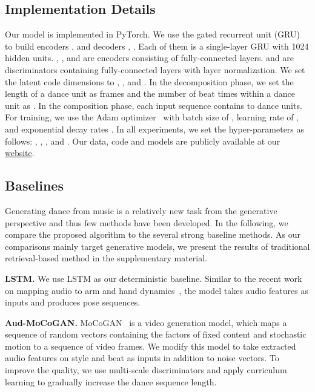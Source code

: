 \documentclass{article}
\newcommand{\tb}[1]{\textbf{#1}}
\newlength\secmargin
\newlength\subsecmargin
\begin{document}
\subsection{Implementation Details}
\label{subsec:implement}
Our model is implemented in PyTorch. 
We use the gated recurrent unit (GRU) to build encoders ,  and decoders , . 
Each of them is a single-layer GRU with 1024 hidden units. 
, , and  are encoders consisting of  fully-connected layers.
 and  are discriminators containing  fully-connected layers with layer normalization.
We set the latent code dimensions to , , and . 
In the decomposition phase, we set the length of a dance unit as  frames and the number of beat times within a dance unit as . 
In the composition phase, each input sequence contains  to  dance units.
For training, we use the Adam optimizer~\cite{adam} with batch size of , learning rate of , and exponential decay rates . 
In all experiments, we set the hyper-parameters as follows: , , , and . 
Our data, code and models are publicly available at our \href{https://github.com/NVlabs/Dance2Music}{website}.

\vspace{\subsecmargin}
\subsection{Baselines}
\vspace{\subsecmargin}
Generating dance from music is a relatively new task from the generative perspective and thus few methods have been developed. 
In the following, we compare the proposed algorithm to the several strong baseline methods. 
As our comparisons mainly target generative models, we present the results of traditional retrieval-based method in the supplementary material.


\tb{LSTM.} We use LSTM as our deterministic baseline. 
Similar to the recent work on mapping audio to arm and hand dynamics~\cite{shlizerman2017audio}, the model takes audio features as inputs and produces pose sequences.

\tb{Aud-MoCoGAN.}
MoCoGAN~\cite{tulyakov2017mocogan} is a video generation model, which maps a sequence of random vectors containing the factors of fixed content and stochastic motion to a sequence of video frames. 
We modify this model to take extracted audio features on style and beat as inputs in addition to noise vectors.
To improve the quality, we use multi-scale discriminators and apply curriculum learning to gradually increase the dance sequence length.
\end{document}
